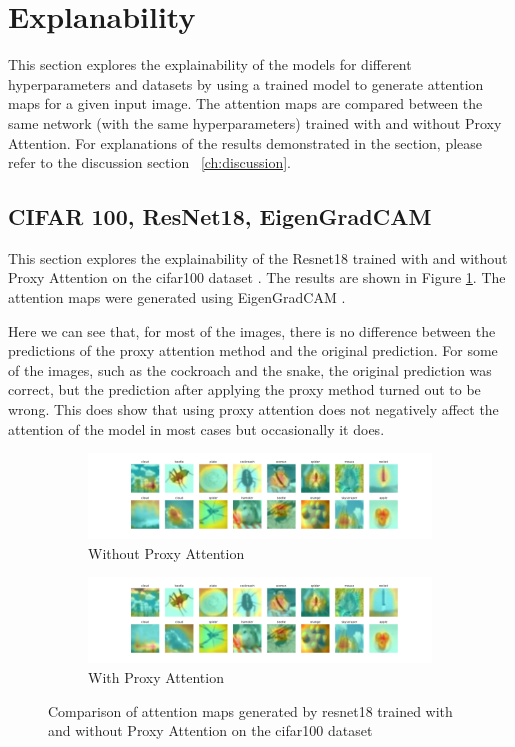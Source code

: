 \section{Explanability}
This section explores the explainability of the models for different hyperparameters and datasets by using a trained model to generate attention maps for a given input image. The attention maps are compared between the same network (with the same hyperparameters) trained with and without Proxy Attention. For explanations of the results demonstrated in the section, please refer to the discussion section ~\ref{ch:discussion}.

\subsection{CIFAR 100, ResNet18, EigenGradCAM}
This section explores the explainability of the Resnet18 \cite{heDeepResidualLearning2016} trained with and without Proxy Attention on the cifar100 dataset \cite{krizhevskyLearningMultipleLayers}. The results are shown in Figure \ref{fig:resnet18_cifar100}. The attention maps were generated using EigenGradCAM \cite{banymuhammadEigenCAMVisualExplanations2021}.

Here we can see that, for most of the images, there is no difference between the predictions of the proxy attention method and the original prediction. For some of the images, such as the cockroach and the snake, the original prediction was correct, but the prediction after applying the proxy method turned out to be wrong. This does show that using proxy attention does not negatively affect the attention of the model in most cases but occasionally it does. 

\begin{figure}[!htb]
    \begin{subfigure}[b]{1\textwidth}
        \includegraphics[width=\linewidth]{images/cifar100_resnet18_noproxy_1.pdf}
        \caption{Without Proxy Attention}
    \end{subfigure}
    \begin{subfigure}[b]{1\textwidth}
        \includegraphics[width=\linewidth]{images/cifar100_resnet18_proxy_1.pdf}
        \caption{With Proxy Attention}
    \end{subfigure}
    
    \caption{Comparison of attention maps generated by resnet18 trained with and without Proxy Attention on the cifar100 dataset}
    \label{fig:resnet18_cifar100}
\end{figure}


